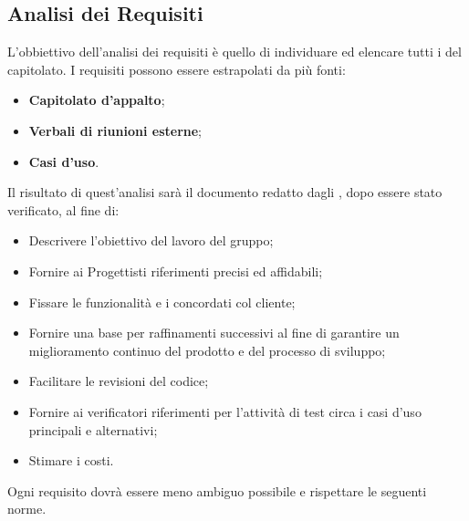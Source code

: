 \documentclass[NormeDiProgetto.tex]{subfiles}
\begin{document}
\subsection{Analisi dei Requisiti}
L'obbiettivo dell'analisi dei requisiti è quello di individuare ed elencare tutti i  del capitolato. I requisiti possono essere estrapolati da più fonti:
\begin{itemize}
	\item \textbf{Capitolato d’appalto};
	\item \textbf{Verbali di riunioni esterne};
	\item \textbf{Casi d’uso}.
\end{itemize}
Il risultato di quest'analisi sarà il documento \adr \vruno{} redatto dagli \alisti{}, dopo essere stato verificato, al fine di:
\begin{itemize}
\item Descrivere l'obiettivo del lavoro del gruppo;
\item Fornire ai Progettisti riferimenti precisi ed affidabili;
\item Fissare le funzionalità e i  concordati col cliente;
\item Fornire una base per raffinamenti successivi al fine di garantire un
miglioramento continuo del prodotto e del processo di sviluppo;
\item Facilitare le revisioni del codice;
\item Fornire ai verificatori riferimenti per l’attività di test circa i casi d’uso principali e alternativi;
\item Stimare i costi.
\end{itemize}
Ogni requisito dovrà essere meno ambiguo possibile e rispettare le seguenti norme.
\end{document}
